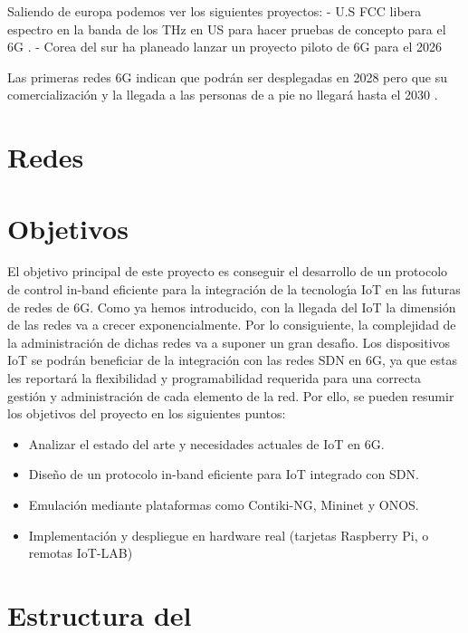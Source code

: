 Saliendo de europa podemos ver los siguientes proyectos:
-   U.S FCC libera espectro en la banda de los THz en US para hacer pruebas de concepto para el 6G \cite{us6g}.
-   Corea del sur ha planeado lanzar un proyecto piloto de 6G para el 2026 \cite{coreaSur6G}


Las primeras redes 6G indican que podrán ser desplegadas en 2028 pero que su comercialización y la llegada a las personas de a pie no llegará hasta el 2030 \cite{Nguyen2022}.



\section{Redes }
\label{sec:6gIoT_sdn}


\section{Objetivos}
\label{sec:obj}

El objetivo principal de este proyecto es conseguir el desarrollo de un protocolo de control in-band eficiente
para la integración de la tecnologı́a IoT en las futuras de redes de 6G. Como ya hemos introducido, con la
llegada del IoT la dimensión de las redes va a crecer exponencialmente. Por lo consiguiente, la complejidad
de la administración de dichas redes va a suponer un gran desafı́o. Los dispositivos IoT se podrán beneficiar
de la integración con las redes SDN en 6G, ya que estas les reportará la flexibilidad y programabilidad
requerida para una correcta gestión y administración de cada elemento de la red. Por ello, se pueden resumir
los objetivos del proyecto en los siguientes puntos:

\begin{itemize}
    \item Analizar el estado del arte y necesidades actuales de IoT en 6G.
    \item Diseño de un protocolo in-band eficiente para IoT integrado con SDN.
    \item Emulación mediante plataformas como Contiki-NG, Mininet y ONOS.
    \item Implementación y despliegue en hardware real (tarjetas Raspberry Pi, o remotas IoT-LAB)
\end{itemize}





\section{Estructura del }
\label{sec:structure}



